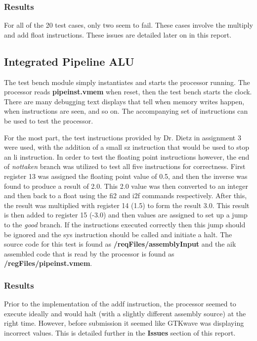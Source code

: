 \documentclass[conference]{IEEEtran}
\begin{document}
\subsubsection{Results}
For all of the 20 test cases, only two seem to fail. These cases involve the multiply and add float instructions. These issues are detailed later on in this report. 


\subsection{Integrated Pipeline ALU }
The test bench module simply instantiates and starts the processor running. The processor reads
\textbf{pipeinst.vmem} when reset, then the test bench starts the clock. There are many debugging text 
displays that tell when memory writes happen, when instructions are seen, and so on. The accompanying
set of instructions can be used to test the processor.

For the most part, the test instructions provided by Dr. Dietz in assignment 3 were used, with the addition
of a small sz instruction that would be used to stop an li instruction. In order to test the floating point 
instructions however, the end of \textit{nottaken} branch was utilized to test all five instructions for 
correctness.
First register 13 was assigned the floating point value of 0.5, and then the inverse was found to produce 
a result of 2.0. This 2.0 value was then converted to an integer and then back to a float using the fi2 and 
i2f commands respectively. After this, the result was multiplied with register 14 (1.5) to form the result
3.0. This result is then added to register 15 (-3.0) and then values are assigned to set up a jump to 
the \textit{good} branch. If the instructions executed correctly then this jump should be ignored and the 
sys instruction should be called and initiate a halt. The source code for this test is found as \textbf{/reqFiles/assemblyInput} and the aik assembled code that is read by the processor is found as \textbf{/regFiles/pipeinst.vmem}. 

\subsubsection{Results}
Prior to the implementation of the addf instruction, the processor seemed to execute ideally and would 
halt (with a slightly different assembly source) at the right time. However, before submission it seemed 
like GTKwave was displaying incorrect values. This is detailed further in the \textbf{Issues} section of this report. 
\end{document}

